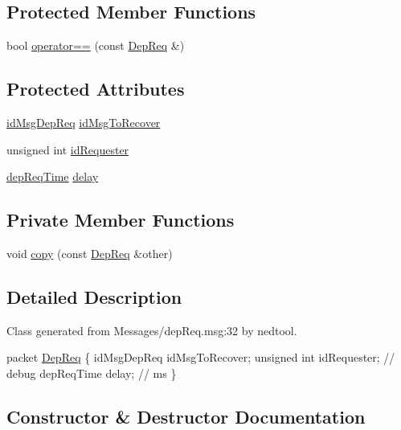 \subsection*{Protected Member Functions}
\begin{DoxyCompactItemize}
\item 
bool \hyperlink{classDepReq_a0426b6cf870f2751d0933d7a9d56134c}{operator==} (const \hyperlink{classDepReq}{Dep\+Req} \&)
\end{DoxyCompactItemize}
\subsection*{Protected Attributes}
\begin{DoxyCompactItemize}
\item 
\hyperlink{depReq__m_8h_a2bbb71ed0e9660ec02d81471eafd9c29}{id\+Msg\+Dep\+Req} \hyperlink{classDepReq_a8547e169d4670212c0b612924dda94cc}{id\+Msg\+To\+Recover}
\item 
unsigned int \hyperlink{classDepReq_a26936e95ef3fae4753d2442318646c6b}{id\+Requester}
\item 
\hyperlink{depReq__m_8h_ae16a4057335e3a89fda3f6019868733b}{dep\+Req\+Time} \hyperlink{classDepReq_a5df5ddeac692e25c089b458faf51e0c9}{delay}
\end{DoxyCompactItemize}
\subsection*{Private Member Functions}
\begin{DoxyCompactItemize}
\item 
void \hyperlink{classDepReq_a3ec88f2216d73f6b499ae6653a60437b}{copy} (const \hyperlink{classDepReq}{Dep\+Req} \&other)
\end{DoxyCompactItemize}


\subsection{Detailed Description}
Class generated from {\ttfamily Messages/dep\+Req.\+msg\+:32} by nedtool. 
\begin{DoxyPre}
packet \hyperlink{classDepReq}{DepReq}
\{
    idMsgDepReq idMsgToRecover;
    unsigned int idRequester; // debug
    depReqTime delay; // ms 
\}
\end{DoxyPre}
 

\subsection{Constructor \& Destructor Documentation}
\mbox{\label{classDepReq_a133b51d43699e8ebecccf069935d93c4}} 
